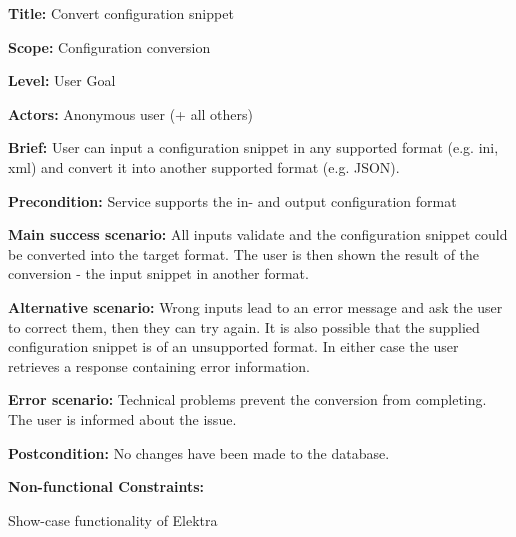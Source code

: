 
\begin{DoxyItemize}
\item {\bfseries{Title\+:}} Convert configuration snippet
\item {\bfseries{Scope\+:}} Configuration conversion
\item {\bfseries{Level\+:}} User Goal
\item {\bfseries{Actors\+:}} Anonymous user (+ all others)
\item {\bfseries{Brief\+:}} User can input a configuration snippet in any supported format (e.\+g. ini, xml) and convert it into another supported format (e.\+g. J\+S\+ON).
\end{DoxyItemize}


\begin{DoxyItemize}
\item {\bfseries{Precondition\+:}} Service supports the in-\/ and output configuration format
\item {\bfseries{Main success scenario\+:}} All inputs validate and the configuration snippet could be converted into the target format. The user is then shown the result of the conversion -\/ the input snippet in another format.
\item {\bfseries{Alternative scenario\+:}} Wrong inputs lead to an error message and ask the user to correct them, then they can try again. It is also possible that the supplied configuration snippet is of an unsupported format. In either case the user retrieves a response containing error information.
\item {\bfseries{Error scenario\+:}} Technical problems prevent the conversion from completing. The user is informed about the issue.
\item {\bfseries{Postcondition\+:}} No changes have been made to the database.
\item {\bfseries{Non-\/functional Constraints\+:}}
\begin{DoxyItemize}
\item Show-\/case functionality of Elektra 
\end{DoxyItemize}
\end{DoxyItemize}